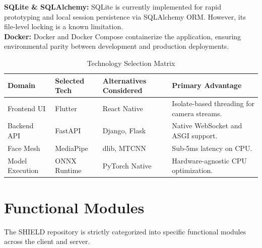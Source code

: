 \vspace{1em}
\textbf{SQLite \& SQLAlchemy:} SQLite is currently implemented for rapid prototyping and local session persistence via SQLAlchemy ORM. However, its file-level locking is a known limitation.
\\
\textbf{Docker:} Docker and Docker Compose containerize the application, ensuring environmental parity between development and production deployments.

\begin{table}[H]
\centering
\caption{Technology Selection Matrix}
\begin{tabularx}{\textwidth}{|X|X|X|X|}
\hline
\textbf{Domain} & \textbf{Selected Tech} & \textbf{Alternatives Considered} & \textbf{Primary Advantage} \\
\hline
Frontend UI & Flutter & React Native & Isolate-based threading for camera streams. \\
Backend API & FastAPI & Django, Flask & Native WebSocket and ASGI support. \\
Face Mesh & MediaPipe & dlib, MTCNN & Sub-5ms latency on CPU. \\
Model Execution & ONNX Runtime & PyTorch Native & Hardware-agnostic CPU optimization. \\
\hline
\end{tabularx}
\end{table}

\chapter{Functional Modules}

The SHIELD repository is strictly categorized into specific functional modules across the client and server.

